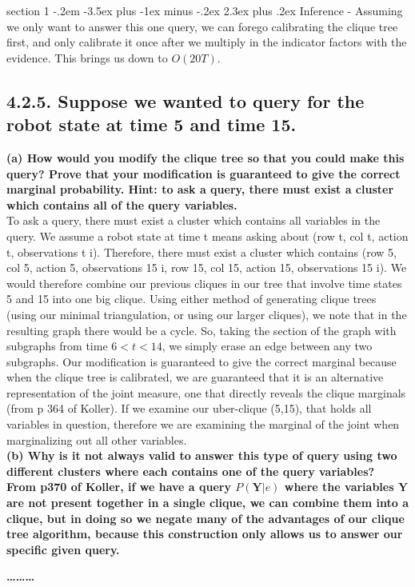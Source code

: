 \documentclass[12pt]{article}
\makeatletter
\newenvironment{problem}{\@startsection
       {section}
       {1}
       {-.2em}
       {-3.5ex plus -1ex minus -.2ex}
       {2.3ex plus .2ex}
       {\pagebreak[3]%
       \large\bf\noindent{Problem }
       }
       }
       {%
       \begin{center}\large\bf \ldots\ldots\ldots\end{center}}
\makeatother
\begin{document}
\begin{problem}{Inference}
\noindent - Assuming we only want to answer this one query, we can forego calibrating the clique tree first, and only calibrate it once after we multiply in the indicator factors with the evidence.  This brings us down to $O(20T)$.\\

\subsection*{4.2.5. Suppose we wanted to query for the robot state at time 5 and time 15.}
{\bf (a) How would you modify the clique tree so that you could make this query?
Prove that your modification is guaranteed to give the correct marginal probability.
Hint: to ask a query, there must exist a cluster which contains all of the query variables.}\\
To ask a query, there must exist a cluster which contains all variables in the query.  We assume a robot state at time t means asking about (row t, col t, action t, observations t i).  Therefore, there must exist a cluster which contains (row 5, col 5, action 5, observations 15 i, row 15, col 15, action 15, observations 15 i).  We would therefore combine our previous cliques in our tree that involve time states 5 and 15 into one big clique.  Using either method of generating clique trees (using our minimal triangulation, or using our larger cliques), we note that in the resulting graph there would be a cycle.  So, taking the section of the graph with subgraphs from time $6 < t < 14$, we simply erase an edge between any two subgraphs.  Our modification is guaranteed to give the correct marginal because when the clique tree is calibrated, we are guaranteed that it is an alternative representation of the joint measure, one that directly reveals the clique marginals (from p 364 of Koller).  If we examine our uber-clique (5,15), that holds all variables in question, therefore we are examining the marginal of the joint when marginalizing out all other variables.\\
{\bf (b) Why is it not always valid to answer this type of query using two different clusters where each contains one of the query variables? \\
From p370 of Koller, if we have a query $P(\textbf{Y} | e)$ where the variables $\textbf{Y}$ are not present together in a single clique, we can combine them into a clique, but in doing so we negate many of the advantages of our clique tree algorithm, because this construction only allows us to answer our specific given query. }\\

\end{problem}
\end{document}
